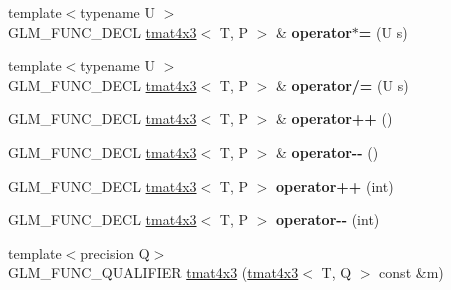 \begin{DoxyCompactItemize}
\item 
\hypertarget{structglm_1_1tmat4x3_a49f3e365fca15f32e4607d209648bb49}{{\footnotesize template$<$typename U $>$ }\\G\-L\-M\-\_\-\-F\-U\-N\-C\-\_\-\-D\-E\-C\-L \hyperlink{structglm_1_1tmat4x3}{tmat4x3}$<$ T, P $>$ \& {\bfseries operator$\ast$=} (U s)}\label{structglm_1_1tmat4x3_a49f3e365fca15f32e4607d209648bb49}

\item 
\hypertarget{structglm_1_1tmat4x3_a42098fc1e415bf49d41c274f7de91670}{{\footnotesize template$<$typename U $>$ }\\G\-L\-M\-\_\-\-F\-U\-N\-C\-\_\-\-D\-E\-C\-L \hyperlink{structglm_1_1tmat4x3}{tmat4x3}$<$ T, P $>$ \& {\bfseries operator/=} (U s)}\label{structglm_1_1tmat4x3_a42098fc1e415bf49d41c274f7de91670}

\item 
\hypertarget{structglm_1_1tmat4x3_af4b18332c7f704b49e7ac15174317398}{G\-L\-M\-\_\-\-F\-U\-N\-C\-\_\-\-D\-E\-C\-L \hyperlink{structglm_1_1tmat4x3}{tmat4x3}$<$ T, P $>$ \& {\bfseries operator++} ()}\label{structglm_1_1tmat4x3_af4b18332c7f704b49e7ac15174317398}

\item 
\hypertarget{structglm_1_1tmat4x3_ae461258920b150f2cb362db59614ac4a}{G\-L\-M\-\_\-\-F\-U\-N\-C\-\_\-\-D\-E\-C\-L \hyperlink{structglm_1_1tmat4x3}{tmat4x3}$<$ T, P $>$ \& {\bfseries operator-\/-\/} ()}\label{structglm_1_1tmat4x3_ae461258920b150f2cb362db59614ac4a}

\item 
\hypertarget{structglm_1_1tmat4x3_aced7018440bc939db70acd9c9e926f4c}{G\-L\-M\-\_\-\-F\-U\-N\-C\-\_\-\-D\-E\-C\-L \hyperlink{structglm_1_1tmat4x3}{tmat4x3}$<$ T, P $>$ {\bfseries operator++} (int)}\label{structglm_1_1tmat4x3_aced7018440bc939db70acd9c9e926f4c}

\item 
\hypertarget{structglm_1_1tmat4x3_abcf46e2d3e6f419c177450b1dd5b7cd2}{G\-L\-M\-\_\-\-F\-U\-N\-C\-\_\-\-D\-E\-C\-L \hyperlink{structglm_1_1tmat4x3}{tmat4x3}$<$ T, P $>$ {\bfseries operator-\/-\/} (int)}\label{structglm_1_1tmat4x3_abcf46e2d3e6f419c177450b1dd5b7cd2}

\item 
\hypertarget{structglm_1_1tmat4x3_a1624d09850df202d4eb177a4ae7819c5}{{\footnotesize template$<$precision Q$>$ }\\G\-L\-M\-\_\-\-F\-U\-N\-C\-\_\-\-Q\-U\-A\-L\-I\-F\-I\-E\-R \hyperlink{structglm_1_1tmat4x3_a1624d09850df202d4eb177a4ae7819c5}{tmat4x3} (\hyperlink{structglm_1_1tmat4x3}{tmat4x3}$<$ T, Q $>$ const \&m)}\label{structglm_1_1tmat4x3_a1624d09850df202d4eb177a4ae7819c5}


\end{DoxyCompactItemize}
